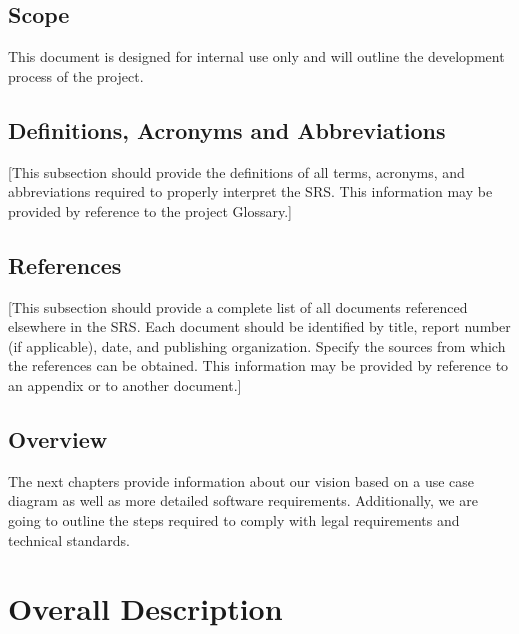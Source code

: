 \documentclass[a4paper,12pt,chapterprefix=false,bibliography=totoc,listof=totoc,]{scrreprt}
\begin{document}
\section{Scope}
This document is designed for internal use only and will outline the development process of the project.

\section{Definitions, Acronyms and Abbreviations}
{\color{blue} [This subsection should provide the definitions of all terms, acronyms, and abbreviations required to properly interpret the SRS.  This information may be provided by reference to the project Glossary.]}

\section{References}
{\color{blue} [This subsection should provide a complete list of all documents referenced elsewhere in the SRS.  Each document should be identified by title, report number (if applicable), date, and publishing organization.  Specify the sources from which the references can be obtained. This information may be provided by reference to an appendix or to another document.]}

\section{Overview}
The next chapters provide information about our vision based on a use case diagram as well as more detailed software requirements. Additionally, we are going to outline the steps required to comply with legal requirements and technical standards.

\chapter{Overall Description}
\end{document}
